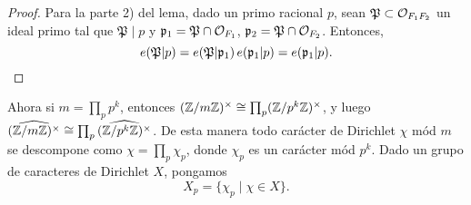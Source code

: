\begin{lema}
\begin{proof}
    Para la parte 2) del lema, dado un primo racional $p$, sean
    $\mathfrak{P} \subset \mathcal{O}_{F_1 F_2}$ un ideal primo tal que
    $\mathfrak{P} \mid p$ y $\mathfrak{p}_1 = \mathfrak{P} \cap \mathcal{O}_{F_1}$,
    $\mathfrak{p}_2 = \mathfrak{P} \cap \mathcal{O}_{F_2}$. Entonces,
    \[ e (\mathfrak{P}|p) =
       e (\mathfrak{P}|\mathfrak{p}_1)\,e (\mathfrak{p}_1|p) =
       e (\mathfrak{p}_1|p). \qedhere\]
  \end{proof}
\end{lema}

Ahora si $m = \prod_p p^k$, entonces
$(\mathbb{Z}/m\mathbb{Z})^\times \cong \prod_p (\mathbb{Z}/p^k\mathbb{Z})^\times$, y luego
$\widehat{(\mathbb{Z}/m\mathbb{Z})^\times} \cong \prod_p \widehat{(\mathbb{Z}/p^k\mathbb{Z})^\times}$.
De esta manera todo carácter de Dirichlet $\chi$ mód $m$ se descompone como
$\chi = \prod_p \chi_p$, donde $\chi_p$ es un carácter mód $p^k$. Dado un grupo
de caracteres de Dirichlet $X$, pongamos
$$X_p = \{ \chi_p \mid \chi \in X \}.$$

